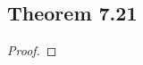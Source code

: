\documentclass[../../main.tex]{subfiles}
\begin{document}
\subsection{Theorem 7.21}
\begin{wts}

\end{wts}
\begin{proof}

\end{proof}
\end{document}
